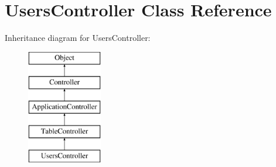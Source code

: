 \hypertarget{class_users_controller}{
\section{UsersController Class Reference}
\label{class_users_controller}
}
Inheritance diagram for UsersController:\begin{figure}[H]
\begin{center}
\leavevmode
\includegraphics[height=5.000000cm]{class_users_controller}
\end{center}
\end{figure}
